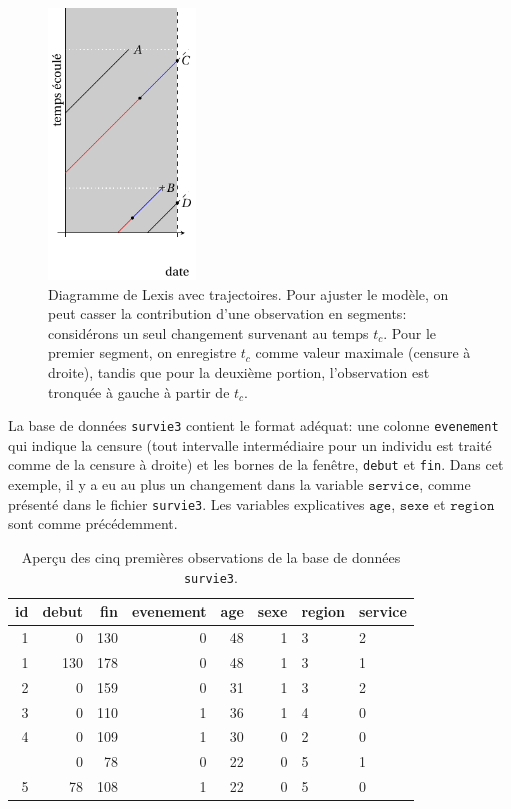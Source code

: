 \documentclass[
  11pt,
  letterpaper,
]{scrbook}
\theoremstyle{definition}
\theoremstyle{remark}
\begin{document}
\begin{figure}[ht!]

{\centering \includegraphics[width=0.35\textwidth,height=\textheight]{figures/Lexis_censure_modif.pdf}

}

\caption{\label{fig-lexischtemps}Diagramme de Lexis avec trajectoires.
Pour ajuster le modèle, on peut casser la contribution d'une observation
en segments: considérons un seul changement survenant au temps \(t_c\).
Pour le premier segment, on enregistre \(t_c\) comme valeur maximale
(censure à droite), tandis que pour la deuxième portion, l'observation
est tronquée à gauche à partir de \(t_c\).}

\end{figure}

La base de données \texttt{survie3} contient le format adéquat: une
colonne \texttt{evenement} qui indique la censure (tout intervalle
intermédiaire pour un individu est traité comme de la censure à droite)
et les bornes de la fenêtre, \texttt{debut} et \texttt{fin}. Dans cet
exemple, il y a eu au plus un changement dans la variable
\(\texttt{service}\), comme présenté dans le fichier \texttt{survie3}.
Les variables explicatives \(\texttt{age}\), \(\texttt{sexe}\) et
\(\texttt{region}\) sont comme précédemment.

\hypertarget{tbl-survie3-donnees}{}
\begin{table}
\caption{\label{tbl-survie3-donnees}Aperçu des cinq premières observations de la base de données
\texttt{survie3}. }\tabularnewline

\centering
\begin{tabular}{rrrrrrll}
\toprule
id & debut & fin & evenement & age & sexe & region & service\\
\midrule
1 & 0 & 130 & 0 & 48 & 1 & 3 & 2\\
1 & 130 & 178 & 0 & 48 & 1 & 3 & 1\\
2 & 0 & 159 & 0 & 31 & 1 & 3 & 2\\
3 & 0 & 110 & 1 & 36 & 1 & 4 & 0\\
4 & 0 & 109 & 1 & 30 & 0 & 2 & 0\\
\addlinespace
5 & 0 & 78 & 0 & 22 & 0 & 5 & 1\\
5 & 78 & 108 & 1 & 22 & 0 & 5 & 0\\
\bottomrule
\end{tabular}
\end{table}
\end{document}
